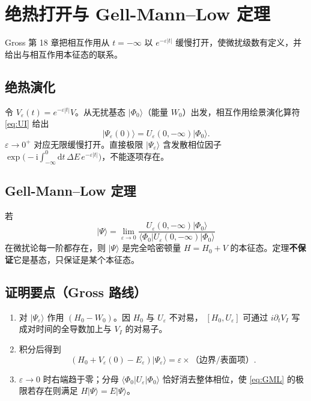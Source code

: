 \section{绝热打开与 Gell-Mann--Low 定理}

Gross 第 18 章把相互作用从 $t=-\infty$ 以 $e^{-\varepsilon|t|}$ 缓慢打开，使微扰级数有定义，并给出与相互作用本征态的联系。

\subsection{绝热演化}

令 $V_\varepsilon(t)=e^{-\varepsilon|t|}V$。从无扰基态 $|\Phi_0\rangle$（能量 $W_0$）出发，相互作用绘景演化算符 \eqref{eq:UI} 给出
\begin{equation}
  |\Psi_\varepsilon(0)\rangle
  =U_{\varepsilon}(0,-\infty)|\Phi_0\rangle.
\end{equation}
$\varepsilon\to0^+$ 对应无限缓慢打开。直接极限 $|\Psi_\varepsilon\rangle$ 含发散相位因子
$\exp\bigl(-\mathrm{i}\int_{-\infty}^{0}\mathrm{d}t\,\Delta E\,e^{-\varepsilon|t|}\bigr)$，不能逐项存在。

\subsection{Gell-Mann--Low 定理}

\begin{theorem}
若
\begin{equation}
  |\Psi\rangle
  =\lim_{\varepsilon\to0}
  \frac{U_\varepsilon(0,-\infty)|\Phi_0\rangle}
  {\langle\Phi_0|U_\varepsilon(0,-\infty)|\Phi_0\rangle}
\label{eq:GML}
\end{equation}
在微扰论每一阶都存在，则 $|\Psi\rangle$ 是完全哈密顿量 $H=H_0+V$ 的本征态。定理\textbf{不保证}它是基态，只保证是某个本征态。
\end{theorem}

\subsection{证明要点（Gross 路线）}

\begin{enumerate}
  \item 对 $|\Psi_\varepsilon\rangle$ 作用 $(H_0-W_0)$。因 $H_0$ 与 $U_\varepsilon$ 不对易，
  $[H_0,U_\varepsilon]$ 可通过 $i\partial_t V_I$ 写成对时间的全导数加上与 $V_I$ 的对易子。
  \item 积分后得到
  \begin{equation}
    (H_0+V_\varepsilon(0)-E_\varepsilon)|\Psi_\varepsilon\rangle
    =\varepsilon\times\text{（边界/表面项）}.
  \end{equation}
  \item $\varepsilon\to0$ 时右端趋于零；分母 $\langle\Phi_0|U_\varepsilon|\Phi_0\rangle$ 恰好消去整体相位，使 \eqref{eq:GML} 的极限若存在则满足 $H|\Psi\rangle=E|\Psi\rangle$。
\end{enumerate}

